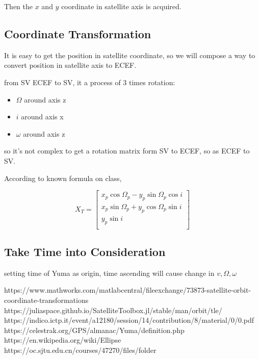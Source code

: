 \documentclass[conference]{IEEEtran}
\begin{document}
Then the $x$ and $y$ coordinate in satellite axis is acquired.

\subsection{Coordinate Transformation}

It is easy to get the position in satellite coordinate, so we will compose a way to convert position in satellite axis to ECEF.

from SV ECEF to SV, it a process of 3 times rotation:
\begin{itemize}
	\item $\Omega$ around axis z
	\item $i$ around axis x
	\item $\omega$ around axis z
\end{itemize}

so it's not complex to get a rotation matrix form SV to ECEF, so as ECEF to SV.

According to known formula on class,

\begin{equation}
X_T=
	\begin{bmatrix}
	x_p\cos\Omega_p - y_p\sin \Omega_p \cos i\\
	x_p\sin\Omega_p + y_p\cos \Omega_p \sin i\\
	y_p \sin i\\
	\end{bmatrix}
\end{equation}

\subsection{Take Time into Consideration}

setting time of Yuma as origin, time ascending will cause change in $v, \Omega, \omega$


\begin{thebibliography}{00}
https://www.mathworks.com/matlabcentral/fileexchange/73873-satellite-orbit-coordinate-transformations
https://juliaspace.github.io/SatelliteToolbox.jl/stable/man/orbit/tle/
https://indico.ictp.it/event/a12180/session/14/contribution/8/material/0/0.pdf
https://celestrak.org/GPS/almanac/Yuma/definition.php
https://en.wikipedia.org/wiki/Ellipse
https://oc.sjtu.edu.cn/courses/47270/files/folder

\end{thebibliography}
\end{document}
